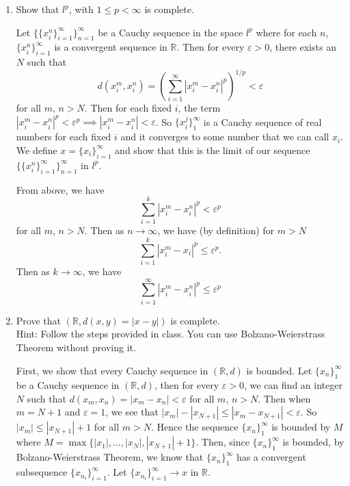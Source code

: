 \documentclass[12pt]{article}
\newcommand{\rl}{\mathbb{R}}
\newcommand{\mR}{\mathbb{R}}
\begin{document}
\begin{enumerate}
\item Show that $l^p$, with $1 \leq p < \infty$ is
    complete.
\begin{mybox}

    Let $\{\{x_i^n\}_{i=1}^\infty\}_{n=1}^\infty$
    be a Cauchy sequence in
    the space $l^p$ where for each $n$,
    $\{x_i^n\}_{i=1}^\infty$ is a convergent
    sequence in $\rl$. Then for every $\varepsilon>0$,
    there exists an $N$ such that
    $$d(x_i^m,x_i^n)
    =\left(\sum_{i=1}^\infty{
        |x_i^m-x_i^n|^p
    }\right)^{1/p}<\varepsilon$$
    for all $m$, $n>N$. Then for each fixed $i$,
    the term
    $|x_i^m-x_i^n|^p<\varepsilon^p\implies
    |x_i^m-x_i^n|<\varepsilon$. So 
    $\{x_i^j\}_1^\infty$ is a Cauchy
    sequence of real
    numbers for each fixed $i$ and it converges
    to some number that we can call $x_i$.
    We define $x=\{x_i\}_{i=1}^\infty$ and show that
    this is the limit of our sequence
    $\{\{x_i^n\}_{i=1}^\infty\}_{n=1}^\infty$ in
    $l^p$.

    From above, we have
    $$\sum_{i=1}^k{
        |x_i^m-x_i^n|^p
    }<\varepsilon^p$$ for all $m$, $n>N$. Then as 
    $n\to \infty$, we have (by definition) for $m>N$
    $$\sum_{i=1}^k{
        |x_i^m-x_i|^p
    }\leq\varepsilon^p.$$
    Then as $k\to \infty$, we have
    $$\sum_{i=1}^\infty{
        |x_i^m-x_i^n|^p
    }\leq\varepsilon^p$$

\end{mybox}
 
\item Prove that $(\mR, d(x,y) = |x-y|)$ is complete.\\ 
    Hint: Follow the steps provided in class.
    You can use Bolzano-Weierstrass Theorem without
    proving it.
\begin{mybox}

    First, we show that every Cauchy sequence in 
    $(\rl,d)$ is bounded.
    Let $\{x_n\}_1^\infty$ be a Cauchy sequence
    in $(\rl,d)$, then for every $\varepsilon>0$,
    we can find an integer $N$ such that
    $d(x_m,x_n)=|x_m-x_n|<\varepsilon$ 
    for all $m$, $n>N$. Then when $m=N+1$
    and $\varepsilon=1$, we see
    that $|x_m|-|x_{N+1}|\leq|x_m-x_{N+1}|
    <\varepsilon$. So $|x_m|\leq |x_{N+1}| +1$
    for all $m>N$. Hence the sequence
    $\{x_n\}_1^\infty$ is bounded by $M$ where
    $M=\max\{|x_1|,\ldots,|x_N|, |x_{N+1}|+1\}$.
    Then, since $\{x_n\}_1^\infty$ is bounded,
    by Bolzano-Weierstrass Theorem, we know that
    $\{x_n\}_1^\infty$ has a convergent
    subsequence $\{x_{n_i}\}_{i=1}^\infty$.
    Let $\{x_{n_i}\}_{i=1}^\infty\to x$ in $\rl$.


\end{mybox}
\end{enumerate}
\end{document}
